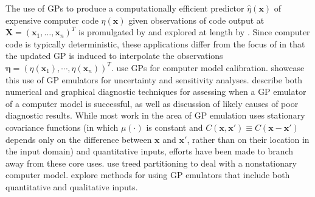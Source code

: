 \documentclass{article}
\begin{document}
The use of GPs to produce a computationally efficient predictor $\hat \eta (\mathbf x)$ of expensive computer code $\eta(\mathbf x)$ given observations of code output at $\mathbf X=(\mathbf x_1,\ldots,\mathbf x_n)^T$ is promulgated by \cite{Sacks1989} and explored at length by \cite{Santner2003a}.
%
Since computer code is typically deterministic, these applications differ from the focus of \cite{OHagan1978} in that the updated GP is induced to interpolate the observations $\boldsymbol \eta = (\eta(\mathbf x_1),\cdots,\eta(\mathbf x_n))^T$. 
%
\cite{Kennedy2001} use GPs for computer model calibration. 
%
\cite{Kennedy2006} showcase this use of GP emulators for uncertainty and sensitivity analyses. 
%
\cite{Bastos2009} describe both numerical and graphical diagnostic techniques for assessing when a GP emulator of a computer model is successful, as well as discussion of likely causes of poor diagnostic results. 
%
While most work in the area of GP emulation uses stationary covariance functions (in which $\mu(\cdot)$ is constant and $C(\mathbf x,\mathbf x' )\equiv C(\mathbf x-\mathbf x' )$ depends only on the difference between $\mathbf x$ and $\mathbf x'$, rather than on their location in the input domain) and quantitative inputs, efforts have been made to branch away from these core uses. 
%
\cite{Gramacy2008} use treed partitioning to deal with a nonstationary computer model. 
%
\cite{Qian2008} explore methods for using GP emulators that include both quantitative and qualitative inputs.
\end{document}
